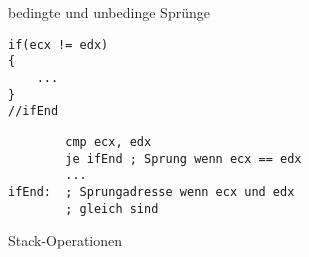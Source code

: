 \begin{frame}[fragile]{bedingte und unbedinge Sprünge}
\begin{lstlisting}
if(ecx != edx)
{
	...
}
//ifEnd
\end{lstlisting}

\begin{lstlisting}
        cmp ecx, edx
        je ifEnd ; Sprung wenn ecx == edx
        ...
ifEnd:  ; Sprungadresse wenn ecx und edx
        ; gleich sind 
\end{lstlisting}
\end{frame}

\begin{frame}{Stack-Operationen}
\end{frame}
